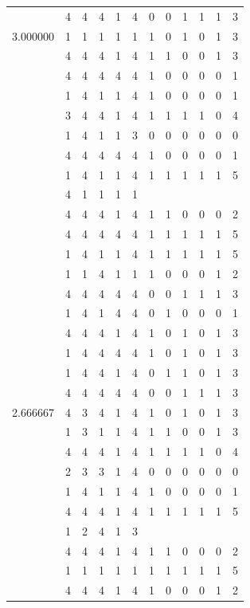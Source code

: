 \documentclass[]{book}
\theoremstyle{definition}
\theoremstyle{definition}
\theoremstyle{definition}
\theoremstyle{remark}
\begin{document}
\begin{table}
{\begin{tabular}[t]{rrrrrrrrrrrr}
 & 4 & 4 & 4 & 1 & 4 & 0 & 0 & 1 & 1 & 1 & 3\\
3.000000 & 1 & 1 & 1 & 1 & 1 & 1 & 0 & 1 & 0 & 1 & 3\\
 & 4 & 4 & 4 & 1 & 4 & 1 & 1 & 0 & 0 & 1 & 3\\
 & 4 & 4 & 4 & 4 & 4 & 1 & 0 & 0 & 0 & 0 & 1\\
 & 1 & 4 & 1 & 1 & 4 & 1 & 0 & 0 & 0 & 0 & 1\\
 & 3 & 4 & 4 & 1 & 4 & 1 & 1 & 1 & 1 & 0 & 4\\
 & 1 & 4 & 1 & 1 & 3 & 0 & 0 & 0 & 0 & 0 & 0\\
 & 4 & 4 & 4 & 4 & 4 & 1 & 0 & 0 & 0 & 0 & 1\\
 & 1 & 4 & 1 & 1 & 4 & 1 & 1 & 1 & 1 & 1 & 5\\
 & 4 & 1 & 1 & 1 & 1 &  &  &  &  &  & \\
 & 4 & 4 & 4 & 1 & 4 & 1 & 1 & 0 & 0 & 0 & 2\\
 & 4 & 4 & 4 & 4 & 4 & 1 & 1 & 1 & 1 & 1 & 5\\
 & 1 & 4 & 1 & 1 & 4 & 1 & 1 & 1 & 1 & 1 & 5\\
 & 1 & 1 & 4 & 1 & 1 & 1 & 0 & 0 & 0 & 1 & 2\\
 & 4 & 4 & 4 & 4 & 4 & 0 & 0 & 1 & 1 & 1 & 3\\
 & 1 & 4 & 1 & 4 & 4 & 0 & 1 & 0 & 0 & 0 & 1\\
 & 4 & 4 & 4 & 1 & 4 & 1 & 0 & 1 & 0 & 1 & 3\\
 & 1 & 4 & 4 & 4 & 4 & 1 & 0 & 1 & 0 & 1 & 3\\
 & 1 & 4 & 4 & 1 & 4 & 0 & 1 & 1 & 0 & 1 & 3\\
 & 4 & 4 & 4 & 4 & 4 & 0 & 0 & 1 & 1 & 1 & 3\\
2.666667 & 4 & 3 & 4 & 1 & 4 & 1 & 0 & 1 & 0 & 1 & 3\\
 & 1 & 3 & 1 & 1 & 4 & 1 & 1 & 0 & 0 & 1 & 3\\
 & 4 & 4 & 4 & 1 & 4 & 1 & 1 & 1 & 1 & 0 & 4\\
 & 2 & 3 & 3 & 1 & 4 & 0 & 0 & 0 & 0 & 0 & 0\\
 & 1 & 4 & 1 & 1 & 4 & 1 & 0 & 0 & 0 & 0 & 1\\
 & 4 & 4 & 4 & 1 & 4 & 1 & 1 & 1 & 1 & 1 & 5\\
 & 1 & 2 & 4 & 1 & 3 &  &  &  &  &  & \\
 & 4 & 4 & 4 & 1 & 4 & 1 & 1 & 0 & 0 & 0 & 2\\
 & 1 & 1 & 1 & 1 & 1 & 1 & 1 & 1 & 1 & 1 & 5\\
 & 4 & 4 & 4 & 1 & 4 & 1 & 0 & 0 & 0 & 1 & 2\\

\end{tabular}}
\end{table}
\end{document}
